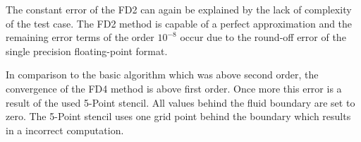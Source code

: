 The constant error of the FD2 can again be explained by the lack of complexity of the test case.
The FD2 method is capable of a perfect approximation and
the remaining error terms of the order $10^{-8}$
occur due to the round-off error of the single precision floating-point format.

In comparison to the basic algorithm which was above second order, the convergence of the FD4 method is above first order.
Once more this error is a result of the used 5-Point stencil.  All values behind the fluid boundary are set
to zero. The 5-Point stencil uses one grid point behind the boundary which results in a incorrect computation.


